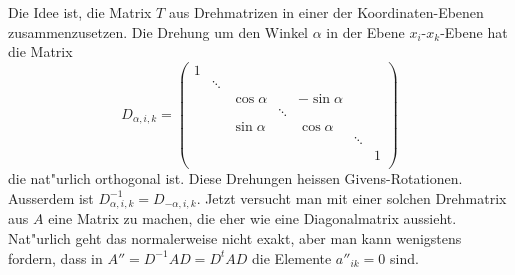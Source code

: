 Die Idee ist, die Matrix $T$ aus Drehmatrizen in einer der Koordinaten-Ebenen
zusammenzusetzen. Die Drehung um den Winkel $\alpha$ in der Ebene
$x_i$-$x_k$-Ebene hat die Matrix
\begin{equation}
D_{\alpha,i,k}=\begin{pmatrix}
1     &      &           &      &           &      &      \\
      &\ddots&           &      &           &      &      \\
      &      & \cos\alpha&      &-\sin\alpha&      &      \\
      &      &           &\ddots&           &      &      \\
      &      & \sin\alpha&      & \cos\alpha&      &      \\
      &      &           &      &           &\ddots&      \\
      &      &           &      &           &      &1     \\
\end{pmatrix}
\label{matrixd}
\end{equation}
die nat"urlich orthogonal ist.
Diese Drehungen heissen Givens-Rotationen.
Ausserdem ist
$D_{\alpha,i,k}^{-1}=D_{-\alpha,i,k}$. Jetzt versucht man mit
einer solchen Drehmatrix aus $A$ eine Matrix zu machen, die 
eher wie eine Diagonalmatrix aussieht. Nat"urlich geht das
normalerweise nicht exakt, aber man kann wenigstens fordern,
dass in $A''= D^{-1}AD=D^tAD$ die Elemente $a''_{ik}=0$ sind.

